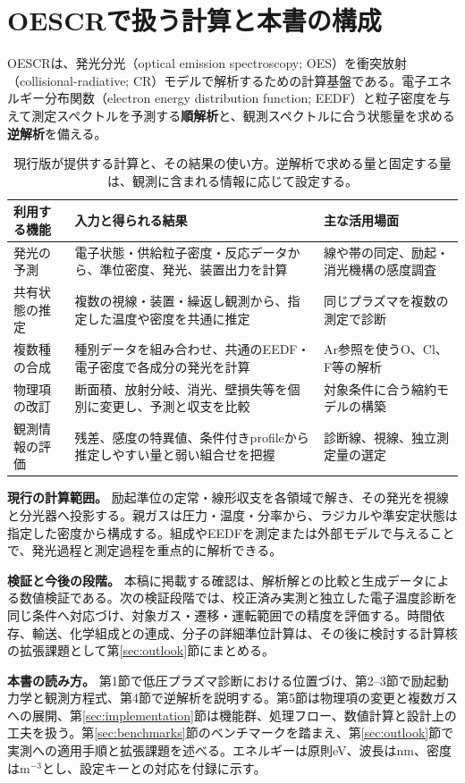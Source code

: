 \section*{OESCRで扱う計算と本書の構成}
OESCRは、発光分光（optical emission spectroscopy; OES）を衝突放射（collisional-radiative; CR）モデルで解析するための計算基盤である。電子エネルギー分布関数（electron energy distribution function; EEDF）と粒子密度を与えて測定スペクトルを予測する\textbf{順解析}と、観測スペクトルに合う状態量を求める\textbf{逆解析}を備える。

\begin{table}[htbp]
\centering\small
\begin{tabularx}{\linewidth}{p{28mm}YY}
\toprule
利用する機能 & 入力と得られる結果 & 主な活用場面 \\
\midrule
発光の予測 & 電子状態・供給粒子密度・反応データから、準位密度、発光、装置出力を計算 & 線や帯の同定、励起・消光機構の感度調査 \\
共有状態の推定 & 複数の視線・装置・繰返し観測から、指定した温度や密度を共通に推定 & 同じプラズマを複数の測定で診断 \\
複数種の合成 & 種別データを組み合わせ、共通のEEDF・電子密度で各成分の発光を計算 & Ar参照を使うO、Cl、F等の解析 \\
物理項の改訂 & 断面積、放射分岐、消光、壁損失等を個別に変更し、予測と収支を比較 & 対象条件に合う縮約モデルの構築 \\
観測情報の評価 & 残差、感度の特異値、条件付きprofileから推定しやすい量と弱い組合せを把握 & 診断線、視線、独立測定量の選定 \\
\bottomrule
\end{tabularx}
\caption{現行版が提供する計算と、その結果の使い方。逆解析で求める量と固定する量は、観測に含まれる情報に応じて設定する。}
\end{table}

\noindent\textbf{現行の計算範囲。} 励起準位の定常・線形収支を各領域で解き、その発光を視線と分光器へ投影する。親ガスは圧力・温度・分率から、ラジカルや準安定状態は指定した密度から構成する。組成やEEDFを測定または外部モデルで与えることで、発光過程と測定過程を重点的に解析できる。

\noindent\textbf{検証と今後の段階。} 本稿に掲載する確認は、解析解との比較と生成データによる数値検証である。次の検証段階では、校正済み実測と独立した電子温度診断を同じ条件へ対応づけ、対象ガス・遷移・運転範囲での精度を評価する。時間依存、輸送、化学組成との連成、分子の詳細準位計算は、その後に検討する計算核の拡張課題として第\ref{sec:outlook}節にまとめる。

\noindent\textbf{本書の読み方。} 第1節で低圧プラズマ診断における位置づけ、第2--3節で励起動力学と観測方程式、第4節で逆解析を説明する。第5節は物理項の変更と複数ガスへの展開、第\ref{sec:implementation}節は機能群、処理フロー、数値計算と設計上の工夫を扱う。第\ref{sec:benchmarks}節のベンチマークを踏まえ、第\ref{sec:outlook}節で実測への適用手順と拡張課題を述べる。エネルギーは原則eV、波長はnm、密度はm$^{-3}$とし、設定キーとの対応を付録に示す。
